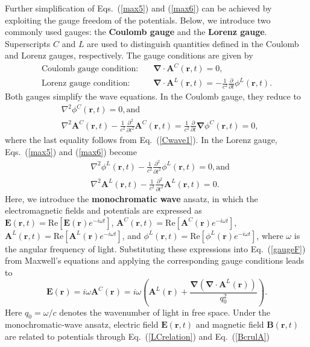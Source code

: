 Further simplification of Eqs.~(\ref{max5}) and (\ref{max6}) can be achieved by exploiting the gauge freedom of the potentials. Below, we introduce two commonly used gauges: the \textbf{Coulomb gauge} and the \textbf{Lorenz gauge}. Superscripts $C$ and $L$ are used to distinguish quantities defined in the Coulomb and Lorenz gauges, respectively. The gauge conditions are given by
\begin{align} 
\text{Coulomb gauge condition}: \quad &\boldsymbol{\nabla}\cdot\boldsymbol{A}^C(\boldsymbol{r}, t)=0,  \label{Ccondition}\\
\text{Lorenz gauge condition}: \quad &\boldsymbol{\nabla}\cdot\boldsymbol{A}^L(\boldsymbol{r}, t)=-\frac{1}{c^2}\frac{\partial }{\partial t}\phi^L(\boldsymbol{r}, t).
\end{align}
Both gauges simplify the wave equations. In the Coulomb gauge, they reduce to
\begin{align} 
&\nabla^2\phi^C(\boldsymbol{r}, t)=0, \text{and} \label{Cwave1}\\
&\nabla^2\boldsymbol{A}^C(\boldsymbol{r}, t)-\frac{1}{c^2}\frac{\partial^2 }{\partial t^2}\boldsymbol{A}^C(\boldsymbol{r}, t)=\frac{1}{c^2}\frac{\partial }{\partial t}\boldsymbol{\nabla}\phi^C(\boldsymbol{r}, t)=0, \label{Cwave2}
\end{align}
where the last equality follows from Eq.~(\ref{Cwave1}).
In the Lorenz gauge, Eqs.~(\ref{max5}) and (\ref{max6}) become
\begin{align} 
&\nabla^2\phi^L(\boldsymbol{r}, t)-\frac{1}{c^2}\frac{\partial^2 }{\partial t^2}\phi^L(\boldsymbol{r}, t)=0, \text{and} \label{Lwave1}\\
&\nabla^2\boldsymbol{A}^L(\boldsymbol{r}, t)-\frac{1}{c^2}\frac{\partial^2 }{\partial t^2}\boldsymbol{A}^L(\boldsymbol{r}, t)=0. \label{Lwave2}
\end{align}
Here, we introduce the \textbf{monochromatic wave} ansatz, in which the electromagnetic fields and potentials are expressed as 
$\boldsymbol{E}(\boldsymbol{r}, t)=\mathrm{Re}\left[\boldsymbol{E}(\boldsymbol{r}) e^{-i\omega t}\right]$,
$\boldsymbol{A}^C(\boldsymbol{r}, t)=\mathrm{Re}\left[\boldsymbol{A}^C(\boldsymbol{r}) e^{-i\omega t}\right]$,
$\boldsymbol{A}^L(\boldsymbol{r}, t)=\mathrm{Re}\left[\boldsymbol{A}^L(\boldsymbol{r}) e^{-i\omega t}\right]$, and
$\phi^L(\boldsymbol{r}, t)=\mathrm{Re}\left[\phi^L(\boldsymbol{r}) e^{-i\omega t}\right]$,
where $\omega$ is the angular frequency of light. Substituting these expressions into Eq.~(\ref{gaugeF}) from Maxwell's equations and applying the corresponding gauge conditions leads to
\begin{equation} 
\boldsymbol{E}(\boldsymbol{r})=i\omega\boldsymbol{A}^C(\boldsymbol{r})=
i\omega\left(\boldsymbol{A}^L(\boldsymbol{r})+
\frac{\boldsymbol{\nabla}\left(\boldsymbol{\nabla}\cdot\boldsymbol{A}^L(\boldsymbol{r})\right)}{q_0^2}\right).
\label{LCrelation}
\end{equation}
Here $q_0=\omega/c$ denotes the wavenumber of light in free space. Under the monochromatic-wave ansatz, electric field $\boldsymbol{E}(\boldsymbol{r}, t)$ and magnetic field $\boldsymbol{B}(\boldsymbol{r}, t)$ are related to potentials through Eq.~(\ref{LCrelation}) and Eq.~(\ref{BcrulA})
%
%
%
%
%
%
